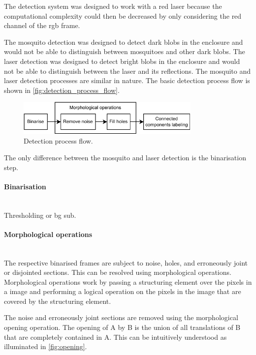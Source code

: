 The detection system was designed to work with a red laser because the computational complexity could then be decreased by only considering the red channel of the \gls{rgb} frame.

The mosquito detection was designed to detect dark blobs in the enclosure and would not be able to distinguish between mosquitoes and other dark blobs. The laser detection was designed to detect bright blobs in the enclosure and would not be able to distinguish between the laser and its reflections. The mosquito and laser detection processes are similar in nature. The basic detection process flow is shown in \autoref{fig:detection_process_flow}.

\begin{figure}[h]
    \centering
    \includegraphics[width=0.8\textwidth]{figures/detection/detection_process_flow.pdf}
    \caption{Detection process flow.}
    \label{fig:detection_process_flow}
\end{figure}

The only difference between the mosquito and laser detection is the binarisation step.

\paragraph{Binarisation}\mbox{}\\
Thresholding or bg sub.

\paragraph{Morphological operations}\mbox{}\\
The respective binarised frames are subject to noise, holes, and erroneously joint or disjointed sections. This can be resolved using morphological operations. Morphological operations work by passing a structuring element over the pixels in a image and performing a logical operation on the pixels in the image that are covered by the structuring element.

The noise and erroneously joint sections are removed using the morphological opening operation. The opening of A by B is the union of all translations of B that are completely contained in A. This can be intuitively understood as illuminated in \autoref{fig:opening}.

